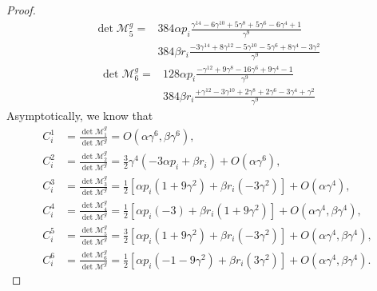 \documentclass[11pt,letterpaper]{amsart}
\newcommand{\mM}{\mathcal{M}}
\theoremstyle{definition}
\theoremstyle{remark}
\numberwithin{equation}{section}
\begin{document}
\begin{proof}
\begin{equation}
\begin{split}
\det \mM^g_5=&384\alpha p_i \frac{
      \gamma^{14} - 6\gamma^{10} + 5\gamma^8 + 5\gamma^6 - 6\gamma^4  + 1}{\gamma^9} \\
      &384 \beta r_i \frac{- 3\gamma^{14} + 8\gamma^{12} - 5\gamma^{10} - 5\gamma^6 + 8\gamma^4 - 3\gamma^2 }{\gamma^9} 
\end{split}
\end{equation}
\begin{equation}
    \begin{split}
        \det \mM^g_6=&128\alpha p_i \frac{
      -\gamma^{12}  + 9\gamma^8  - 16\gamma^6 + 9\gamma^4 - 1}{\gamma^9} \\
      &384\beta r_i\frac{+ \gamma^{12} - 3\gamma^{10} + 2\gamma^8 + 2\gamma^6 - 3\gamma^4 + \gamma^2  }{\gamma^9}
    \end{split}
\end{equation}
Asymptotically, we know that
\begin{equation}
\begin{split}
C_i^1&=\frac{\det \mM^g_1}{\det \mM^g}=O(\alpha\gamma^6, \beta\gamma^6),\\
C_i^2&=\frac{\det \mM^g_2}{\det \mM^g}=\frac{3}{2}\gamma^4\left( -3 \alpha p_i+\beta r_i\right)+O(\alpha\gamma^6),\\
C_i^3&=\frac{\det \mM^g_3}{\det \mM^g}=\frac{1}{2}\left[\alpha p_i(1+9\gamma^2)+\beta r_i(-3\gamma^2)\right]+O(\alpha\gamma^4),\\
C_i^4&=\frac{\det \mM^g_4}{\det \mM^g}=\frac{1}{2}\left[\alpha p_i(-3)+\beta r_i(1+9\gamma^2)\right]+O(\alpha\gamma^4,\beta\gamma^4),\\
C_i^5&=\frac{\det \mM^g_5}{\det \mM^g}=\frac{3}{2}\left[\alpha p_i(1+9\gamma^2)+\beta r_i(-3\gamma^2)\right]+O(\alpha\gamma^4, \beta\gamma^4),\\
C_i^6&=\frac{\det \mM^g_6}{\det \mM^g}=\frac{1}{2}\left[\alpha p_i(-1-9\gamma^2)+\beta r_i(3\gamma^2)\right]+O(\alpha\gamma^4,\beta\gamma^4).
\end{split}
\end{equation}

\end{proof}
\end{document}

